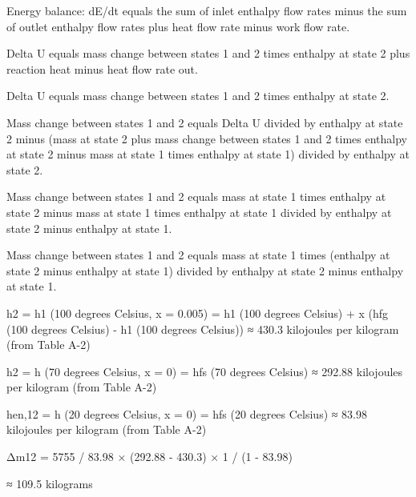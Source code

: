 Energy balance:  
dE/dt equals the sum of inlet enthalpy flow rates minus the sum of outlet enthalpy flow rates plus heat flow rate minus work flow rate.  

Delta U equals mass change between states 1 and 2 times enthalpy at state 2 plus reaction heat minus heat flow rate out.  

Delta U equals mass change between states 1 and 2 times enthalpy at state 2.  

Mass change between states 1 and 2 equals Delta U divided by enthalpy at state 2 minus (mass at state 2 plus mass change between states 1 and 2 times enthalpy at state 2 minus mass at state 1 times enthalpy at state 1) divided by enthalpy at state 2.  

Mass change between states 1 and 2 equals mass at state 1 times enthalpy at state 2 minus mass at state 1 times enthalpy at state 1 divided by enthalpy at state 2 minus enthalpy at state 1.  

Mass change between states 1 and 2 equals mass at state 1 times (enthalpy at state 2 minus enthalpy at state 1) divided by enthalpy at state 2 minus enthalpy at state 1.

h2 = h1 (100 degrees Celsius, x = 0.005) = h1 (100 degrees Celsius) + x (hfg (100 degrees Celsius) - h1 (100 degrees Celsius))  
≈ 430.3 kilojoules per kilogram (from Table A-2)  

h2 = h (70 degrees Celsius, x = 0) = hfs (70 degrees Celsius) ≈ 292.88 kilojoules per kilogram (from Table A-2)  

hen,12 = h (20 degrees Celsius, x = 0) = hfs (20 degrees Celsius) ≈ 83.98 kilojoules per kilogram (from Table A-2)  

Δm12 = 5755 / 83.98 × (292.88 - 430.3) × 1 / (1 - 83.98)  

≈ 109.5 kilograms